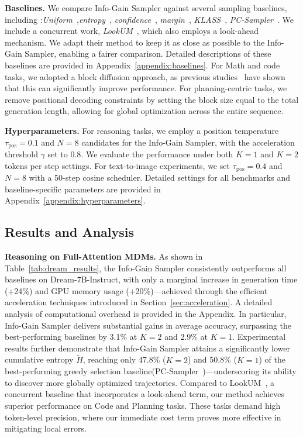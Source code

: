 \noindent\textbf{Baselines.}
We compare Info-Gain Sampler against several sampling baselines, including :\textit{Uniform}~\cite{nie2025large},\textit{entropy}~\cite{ye2025dream}, \textit{confidence}~\cite{chang2022maskgit}, \textit{margin}~\cite{kim2025train}, \textit{KLASS}~\cite{kim2025klass}, \textit{PC-Sampler}~\cite{huang2025pc}. We include a concurrent work, \textit{LookUM}~\cite{lee2025lookahead}, which also employs a look-ahead mechanism. We adapt their method to keep it as close as possible to the Info-Gain Sampler, enabling a fairer comparison. Detailed descriptions of these baselines are provided in Appendix~\ref{appendix:baselines}.
For Math and code tasks, we adopted a block diffusion approach, as previous studies~\cite{arriola2025block,wu2025fast} have shown that this can significantly improve performance. For planning-centric tasks, we remove positional decoding constraints by setting the block size equal to the total generation length, allowing for global optimization across the entire sequence.

\noindent \textbf{Hyperparameters.} For reasoning tasks, we employ a position temperature $\tau_{\text{pos}}=0.1$ and $N=8$ candidates for the Info-Gain Sampler, with the acceleration threshold $\gamma$ set to $0.8$. We evaluate the performance under both $K=1$ and $K=2$ tokens per step settings. For text-to-image experiments, we set $\tau_{\text{pos}}=0.4$ and $N=8$ with a 50-step cosine scheduler. Detailed settings for all benchmarks and baseline-specific parameters are provided in Appendix~\ref{appendix:hyperparameters}.

\subsection{Results and Analysis}
\label{sec:result-analysis}
\noindent \textbf{Reasoning on Full-Attention MDMs.}
As shown in Table~\ref{tab:dream_results}, the Info-Gain Sampler consistently outperforms all baselines on Dream-7B-Instruct, with only a marginal increase in generation time (+24\%) and GPU memory usage (+20\%)—achieved through the efficient acceleration techniques introduced in Section~\ref{sec:acceleration}. A detailed analysis of computational overhead is provided in the Appendix. In particular, Info-Gain Sampler delivers substantial gains in average accuracy, surpassing the best-performing baselines by {3.1\%} at $K=2$ and {2.9\%} at $K=1$. Experimental results further demonstrate that Info-Gain Sampler attains a significantly lower cumulative entropy $\tilde{H}$, reaching only {47.8\%} ($K=2$) and {50.8\%} ($K=1$) of the best-performing greedy selection baseline(PC-Sampler~\cite{huang2025pc})—underscoring its ability to discover more globally optimized trajectories. Compared to LookUM~\cite{lee2025lookahead}, a concurrent baseline that incorporates a look-ahead term, our method achieves superior performance on Code and Planning tasks. These tasks demand high token-level precision, where our immediate cost term proves more effective in mitigating local errors.

